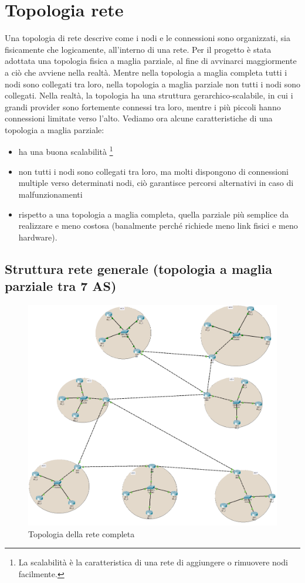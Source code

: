 \documentclass[12pt,a4paper,twoside]{book}
\begin{document}
\section{Topologia rete}
Una topologia di rete descrive come i nodi e le connessioni sono organizzati, sia fisicamente che logicamente, all'interno di una rete.
Per il progetto è stata adottata una topologia fisica a maglia parziale, al fine di avvinarci maggiormente a ciò che avviene nella realtà. Mentre nella topologia a maglia completa tutti i nodi sono collegati tra loro, nella topologia a maglia parziale non tutti i nodi sono collegati.
Nella realtà, la topologia ha una struttura gerarchico-scalabile, in cui i grandi provider sono fortemente connessi tra loro, mentre i più piccoli hanno connessioni limitate verso l'alto.
Vediamo ora alcune caratteristiche di una topologia a maglia parziale:
\begin{itemize}
    \item ha una buona scalabilità \footnote{La scalabilità è la caratteristica di una rete di aggiungere o rimuovere nodi facilmente.}
    \item non tutti i nodi sono collegati tra loro, ma molti dispongono di connessioni multiple verso determinati nodi, ciò garantisce percorsi alternativi in caso di malfunzionamenti
    \item rispetto a una topologia a maglia completa, quella parziale più semplice da realizzare e meno costosa (banalmente perché richiede meno link fisici e meno hardware).
\end{itemize}

\subsection{Struttura rete generale (topologia a maglia parziale tra 7 AS)}
\begin{figure}[H]
    \centering
    \includegraphics[width=.8\linewidth]{img/topologia_completa.png}
    \caption{Topologia della rete completa}
    \label{fig:topologia_completa}
\end{figure}
\end{document}

